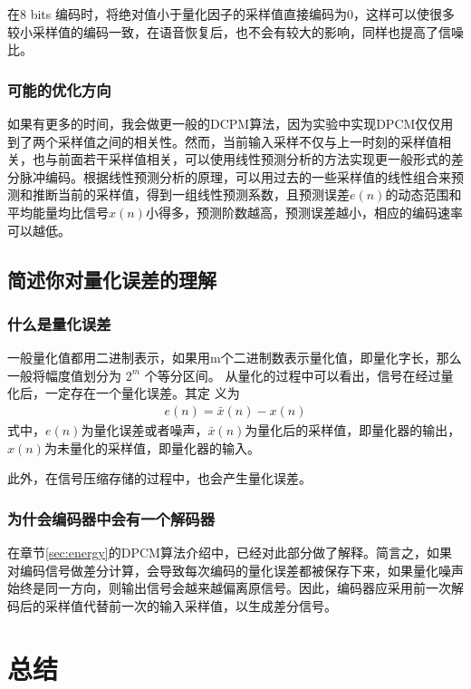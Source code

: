 \documentclass{hitreport}
\begin{document}
在8 bits 编码时，将绝对值小于量化因子的采样值直接编码为0，这样可以使很多较小采样值的编码一致，在语音恢复后，也不会有较大的影响，同样也提高了信噪比。

\subsubsection{可能的优化方向}

如果有更多的时间，我会做更一般的DCPM算法，因为实验中实现DPCM仅仅用到了两个采样值之间的相关性。然而，当前输入采样不仅与上一时刻的采样值相关，也与前面若干采样值相关，可以使用线性预测分析的方法实现更一般形式的差分脉冲编码。根据线性预测分析的原理，可以用过去的一些采样值的线性组合来预测和推断当前的采样值，得到一组线性预测系数，且预测误差$e\left(n\right)$的动态范围和平均能量均比信号$x\left(n\right)$小得多，预测阶数越高，预测误差越小，相应的编码速率可以越低。

\subsection{简述你对量化误差的理解}

\subsubsection{什么是量化误差}

一般量化值都用二进制表示，如果用m个二进制数表示量化值，即量化字长，那么一般将幅度值划分为 $2^m$ 个等分区间。
从量化的过程中可以看出，信号在经过量化后，一定存在一个量化误差。其定
义为
\begin{align}
e\left(n\right) = \bar{x}\left(n\right) - x\left(n\right)
\end{align}
式中，$e\left(n\right)$为量化误差或者噪声，$\bar{x}\left(n\right)$为量化后的采样值，即量化器的输出，$x\left(n\right)$为未量化的采样值，即量化器的输入。

此外，在信号压缩存储的过程中，也会产生量化误差。


\subsubsection{为什会编码器中会有一个解码器}

在章节\ref{sec:energy}的DPCM算法介绍中，已经对此部分做了解释。简言之，如果对编码信号做差分计算，会导致每次编码的量化误差都被保存下来，如果量化噪声始终是同一方向，则输出信号会越来越偏离原信号。因此，编码器应采用前一次解码后的采样值代替前一次的输入采样值，以生成差分信号。

\section{总结}
\end{document}

